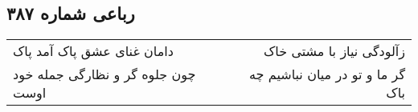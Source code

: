 \begin{center}
\section*{رباعی شماره ۳۸۷}
\label{sec:sh387}
\begin{longtable}{l p{0.5cm} r}
دامان غنای عشق پاک آمد پاک
&&
زآلودگی نیاز با مشتی خاک
\\
چون جلوه گر و نظارگی جمله خود اوست
&&
گر ما و تو در میان نباشیم چه باک
\\
\end{longtable}
\end{center}
